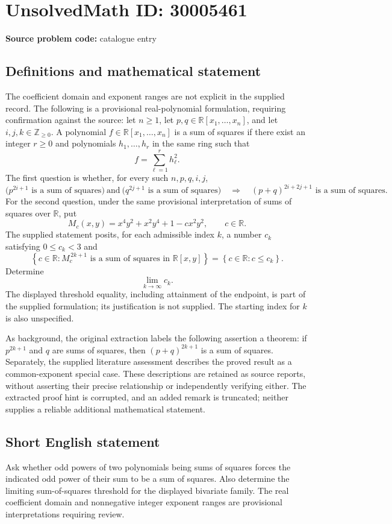 \documentclass[11pt]{article}
\newcommand{\Z}{\mathbb{Z}}
\newcommand{\R}{\mathbb{R}}
\begin{document}
\section*{UnsolvedMath ID: 30005461}
\textbf{Source problem code:} catalogue entry
\subsection{Definitions and mathematical statement}
The coefficient domain and exponent ranges are not explicit in the supplied record. The following is a provisional real-polynomial formulation, requiring confirmation against the source: let \(n\geq 1\), let \(p,q\in\R[x_1,\ldots,x_n]\), and let \(i,j,k\in\Z_{\geq 0}\). A polynomial \(f\in\R[x_1,\ldots,x_n]\) is a sum of squares if there exist an integer \(r\geq 0\) and polynomials \(h_1,\ldots,h_r\) in the same ring such that
\[
f=\sum_{\ell=1}^{r}h_\ell^2.
\]
The first question is whether, for every such \(n,p,q,i,j\),
\[
\bigl(p^{2i+1}\text{ is a sum of squares}\bigr)
\ \text{and}\ 
\bigl(q^{2j+1}\text{ is a sum of squares}\bigr)
\quad\Longrightarrow\quad
(p+q)^{2i+2j+1}\text{ is a sum of squares}.
\]
For the second question, under the same provisional interpretation of sums of squares over \(\R\), put
\[
M_c(x,y)=x^4y^2+x^2y^4+1-cx^2y^2,
\qquad c\in\R.
\]
The supplied statement posits, for each admissible index \(k\), a number \(c_k\) satisfying \(0\leq c_k<3\) and
\[
\left\{c\in\R:M_c^{\,2k+1}\text{ is a sum of squares in }\R[x,y]\right\}
=
\left\{c\in\R:c\leq c_k\right\}.
\]
Determine
\[
\lim_{k\to\infty}c_k.
\]
The displayed threshold equality, including attainment of the endpoint, is part of the supplied formulation; its justification is not supplied. The starting index for \(k\) is also unspecified.

As background, the original extraction labels the following assertion a theorem: if \(p^{2k+1}\) and \(q\) are sums of squares, then \((p+q)^{2k+1}\) is a sum of squares. Separately, the supplied literature assessment describes the proved result as a common-exponent special case. These descriptions are retained as source reports, without asserting their precise relationship or independently verifying either. The extracted proof hint is corrupted, and an added remark is truncated; neither supplies a reliable additional mathematical statement.
\subsection{Short English statement}
Ask whether odd powers of two polynomials being sums of squares forces the indicated odd power of their sum to be a sum of squares. Also determine the limiting sum-of-squares threshold for the displayed bivariate family. The real coefficient domain and nonnegative integer exponent ranges are provisional interpretations requiring review.
\end{document}
